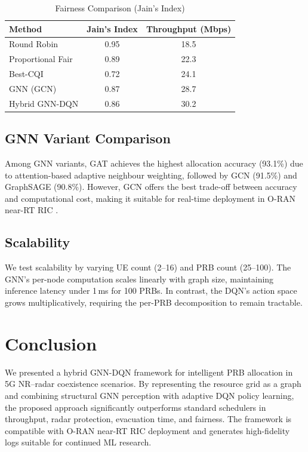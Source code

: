 \documentclass[conference]{IEEEtran}
\begin{document}
\begin{table}[htbp]
\centering
\caption{Fairness Comparison (Jain's Index)}
\label{tab:fairness}
\begin{tabular}{lcc}
\toprule
\textbf{Method} & \textbf{Jain's Index} & \textbf{Throughput (Mbps)} \\
\midrule
Round Robin     & 0.95 & 18.5 \\
Proportional Fair & 0.89 & 22.3 \\
Best-CQI        & 0.72 & 24.1 \\
GNN (GCN)       & 0.87 & 28.7 \\
Hybrid GNN-DQN  & 0.86 & 30.2 \\
\bottomrule
\end{tabular}
\end{table}

\subsection{GNN Variant Comparison}

Among GNN variants, GAT achieves the highest allocation accuracy (93.1\%) due to attention-based adaptive neighbour weighting, followed by GCN (91.5\%) and GraphSAGE (90.8\%). However, GCN offers the best trade-off between accuracy and computational cost, making it suitable for real-time deployment in O-RAN near-RT RIC \cite{oran_wg2}.

\subsection{Scalability}

We test scalability by varying UE count (2--16) and PRB count (25--100). The GNN's per-node computation scales linearly with graph size, maintaining inference latency under 1\,ms for 100 PRBs. In contrast, the DQN's action space grows multiplicatively, requiring the per-PRB decomposition to remain tractable.

\section{Conclusion}

We presented a hybrid GNN-DQN framework for intelligent PRB allocation in 5G NR--radar coexistence scenarios. By representing the resource grid as a graph and combining structural GNN perception with adaptive DQN policy learning, the proposed approach significantly outperforms standard schedulers in throughput, radar protection, evacuation time, and fairness. The framework is compatible with O-RAN near-RT RIC deployment and generates high-fidelity logs suitable for continued ML research.
\end{document}
